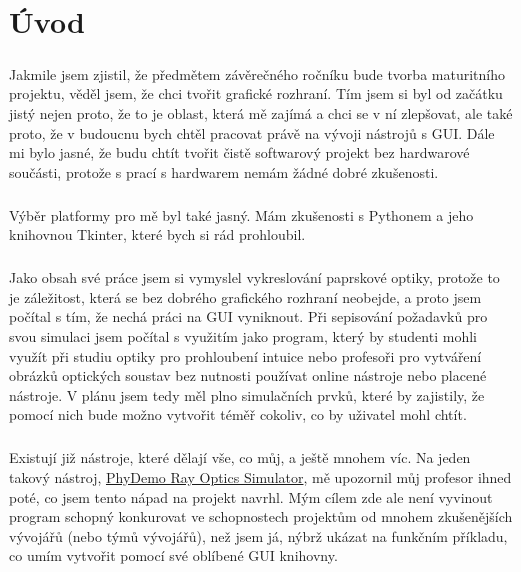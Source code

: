 \documentclass[12pt,a4paper]{report}
\begin{document}
\setcounter{tocdepth}{2} %
\tableofcontents
\newpage
{}

\chapter{Úvod}
\paragraph{} Jakmile jsem zjistil, že předmětem závěrečného ročníku bude tvorba maturitního projektu, věděl jsem, že chci tvořit grafické rozhraní. Tím jsem si byl od začátku jistý nejen proto, že to je oblast, která mě zajímá a chci se v ní zlepšovat, ale také proto, že v budoucnu bych chtěl pracovat právě na vývoji nástrojů s GUI. Dále mi bylo jasné, že budu chtít tvořit čistě softwarový projekt bez hardwarové součásti, protože s prací s hardwarem nemám žádné dobré zkušenosti.
\paragraph{} Výběr platformy pro mě byl také jasný. Mám zkušenosti s Pythonem a jeho knihovnou Tkinter, které bych si rád prohloubil.
\paragraph{} Jako obsah své práce jsem si vymyslel vykreslování paprskové optiky, protože to je záležitost, která se bez dobrého grafického rozhraní neobejde, a proto jsem počítal s tím, že nechá práci na GUI vyniknout. Při sepisování požadavků pro svou simulaci jsem počítal s využitím jako program, který by studenti mohli využít při studiu optiky pro prohloubení intuice nebo profesoři pro vytváření obrázků optických soustav bez nutnosti používat online nástroje nebo placené nástroje. V plánu jsem tedy měl plno simulačních prvků, které by zajistily, že pomocí nich bude možno vytvořit téměř cokoliv, co by uživatel mohl chtít.
\paragraph{} Existují již nástroje, které dělají vše, co můj, a ještě mnohem víc. Na jeden takový nástroj, \href{https://phydemo.app/ray-optics/simulator/}{PhyDemo Ray Optics Simulator}, mě upozornil můj profesor ihned poté, co jsem tento nápad na projekt navrhl. Mým cílem zde ale není vyvinout program schopný konkurovat ve schopnostech projektům od mnohem zkušenějších vývojářů (nebo týmů vývojářů), než jsem já, nýbrž ukázat na funkčním příkladu, co umím vytvořit pomocí své oblíbené GUI knihovny.
\newpage
\end{document}
